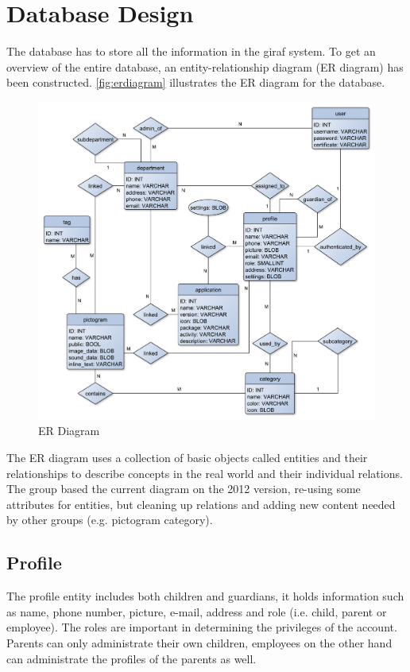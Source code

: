 \section{Database Design}
The database has to store all the information in the \ac{giraf} system.
To get an overview of the entire database, an entity-relationship diagram (ER diagram) has been constructed. \autoref{fig:erdiagram} illustrates the ER diagram for the database.

\begin{figure}[hptb]
\begin{center}
\includegraphics[width=\textwidth]{img/ER_diagram3.pdf}
\caption{ER Diagram}
\label{fig:erdiagram}
\end{center}
\end{figure}

The ER diagram uses a collection of basic objects called entities and their relationships to describe concepts in the real world and their individual relations. The group based the current diagram on the 2012 version, re-using some attributes for entities, but cleaning up relations and adding new content needed by other groups (e.g. pictogram category). 

\subsection{Profile}
The profile entity includes both children and guardians, it holds information such as name, phone number, picture, e-mail, address and role (i.e. child, parent or employee). The roles are important in determining the privileges of the account. Parents can only administrate their own children, employees on the other hand can administrate the profiles of the parents as well. 

